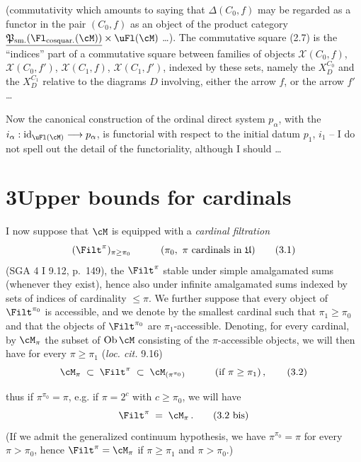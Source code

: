 (commutativity which amounts to saying that $\Delta(C_0,f)$ may be regarded as a functor in the pair $(C_0,f)$ as an object of the product category $\underline{\mathfrak{P}_{\text{sm.}}(\Fl_{\text{cosquar.}}(\cM))}\times\uFl(\cM)$ \ldots). The commutative square (2.7) is the ``indices'' part of a commutative square between families of objects $\mathscr{X}(C_0,f)$, $\mathscr{X}(C_0,f')$, $\mathscr{X}(C_1,f)$, $\mathscr{X}(C_1,f')$,
indexed by these sets, namely the $X_D^{C_0}$ and the $X_D^{C_1}$ relative to the diagrams $D$ involving, either the arrow $f$, or the arrow $f'$ \ldots

Now the canonical construction of the ordinal direct system $p_\alpha$, with the $i_\alpha : \mathrm{id}_{\uFl(\cM)}\longrightarrow p_\alpha$, is functorial with respect to the initial datum $p_1$, $i_1$ -- I do not spell out the detail of the functoriality, although I should \ldots

\section*{3\quad Upper bounds for cardinals}

I now suppose that $\cM$ is equipped with a \textit{cardinal filtration}
\[
(\Filt^\pi)_{\pi\geq\pi_0} \qquad\quad (\pi_0,\ \pi \text{ cardinals in } \mathfrak{U})
\tag*{(3.1)}
\]
(SGA 4 I 9.12, p.~149), the $\Filt^\pi$ stable under simple amalgamated sums (whenever they exist), hence also under infinite amalgamated sums indexed by sets
of indices of cardinality $\leq\pi$. We further suppose that every object of $\Filt^{\pi_0}$ is accessible, and we denote by  the smallest cardinal such that $\pi_1\geq\pi_0$ and that the objects of $\Filt^{\pi_0}$ are $\pi_1$-accessible. Denoting, for every cardinal, by $\cM_\pi$ the subset of $\mathrm{Ob}\,\cM$ consisting of the $\pi$-accessible objects, we will then have for every $\pi\geq\pi_1$ (\textit{loc. cit.} 9.16)
\[
\cM_\pi \;\subset\; \Filt^\pi \;\subset\; \cM_{(\pi^{\pi_0})} \qquad\quad (\text{if } \pi\geq\pi_1)\,,
\tag*{(3.2)}
\]


thus if $\pi^{\pi_0}=\pi$, e.g. if $\pi=2^c$ with $c\geq\pi_0$, we will have
\[
\Filt^\pi \;=\; \cM_\pi\,.
\tag*{(3.2 bis)}
\]
(If we admit the generalized continuum hypothesis, we have $\pi^{\pi_0}=\pi$ for every $\pi>\pi_0$, hence $\Filt^\pi=\cM_\pi$ if $\pi\geq\pi_1$ and $\pi>\pi_0$.)

